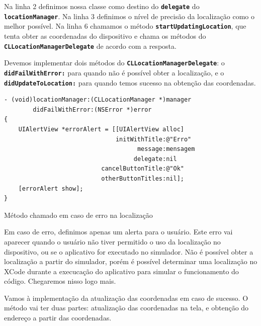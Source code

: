 \documentclass[a4paper,12pt,brazil,oneside]{book}
\begin{document}
Na linha 2 definimos nossa classe como destino do \texttt{\textbf{delegate}} do \texttt{\textbf{locationManager}}. Na linha 3 definimos o nível de precisão da localização como o melhor possível. Na linha 6 chamamos o método \texttt{\textbf{startUpdatingLocation}}, que tenta obter as coordenadas do dispositivo e chama os métodos do \texttt{\textbf{CLLocationManagerDelegate}} de acordo com a resposta.

Devemos implementar dois métodos do \texttt{\textbf{CLLocationManagerDelegate}}: o\\ \texttt{\textbf{didFailWithError:}} para quando não é possível obter a localização, e o\\ \texttt{\textbf{didUpdateToLocation:}} para quando temos sucesso na obtenção das coordenadas.

\begin{listing}[H]
\begin{verbatim}
- (void)locationManager:(CLLocationManager *)manager
        didFailWithError:(NSError *)error
{
    UIAlertView *errorAlert = [[UIAlertView alloc]
                               initWithTitle:@"Erro"
                                     message:mensagem
                                    delegate:nil
                           cancelButtonTitle:@"Ok"
                           otherButtonTitles:nil];
    [errorAlert show];
}
\end{verbatim}
\caption{Método chamado em caso de erro na localização}
\end{listing}


Em caso de erro, definimos apenas um alerta para o usuário. Este erro vai aparecer quando o usuário não tiver permitido o uso da localização no dispositivo, ou se o aplicativo for executado no simulador. Não é possível obter a localização a partir do simulador, porém é possível determinar uma localização no XCode durante a execucação do aplicativo para simular o funcionamento do código. Chegaremos nisso logo mais.

Vamos à implementação da atualização das coordenadas em caso de sucesso. O método vai ter duas partes: atualização das coordenadas na tela, e obtenção do endereço a partir das coordenadas.
\end{document}
